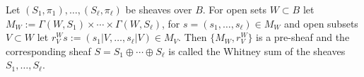 Let $(S_1, \pi_1), \ldots, (S_\ell, \pi_\ell)$ be sheaves over $B$. For open sets $W \subset B$ let $M_W := \Gamma(W, S_1) \times \cdots \times \Gamma(W, S_\ell)$, for $s = (s_1, \ldots, s_\ell) \in M_W$ and open subsets $V \subset W$ let $r_V^W s := (s_1|V, \ldots, s_\ell|V) \in M_V$. Then $\{M_W, r_V^W\}$ is a pre-sheaf and the corresponding sheaf $S = S_1 \oplus \cdots \oplus S_\ell$ is called the Whitney sum of the sheaves $S_1, \ldots, S_\ell$.
